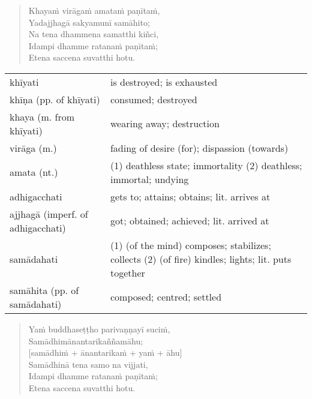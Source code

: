 \documentclass[11pt,oneside]{memoir}
\begin{document}
\begin{quote}
Khayaṁ virāgaṁ amataṁ paṇītaṁ, \\[0pt]
Yadajjhagā sakyamunī samāhito; \\[0pt]
Na tena dhammena samatthi kiñci, \\[0pt]
Idampi dhamme ratanaṁ paṇītaṁ; \\[0pt]
Etena saccena suvatthi hotu.
\end{quote}

\enlargethispage{\baselineskip}

\begin{longtable}{L{\colOne} L{\colTwo}}
khīyati & is destroyed; is exhausted\\[0pt]
khīṇa (pp. of khīyati) & consumed; destroyed\\[0pt]
khaya (m. from khīyati) & wearing away; destruction\\[0pt]
virāga (m.) & fading of desire (for); dispassion (towards)\\[0pt]
amata (nt.) & (1) deathless state; immortality (2) deathless; immortal; undying\\[0pt]
adhigacchati & gets to; attains; obtains; lit. arrives at\\[0pt]
ajjhagā (imperf. of adhigacchati) & got; obtained; achieved; lit. arrived at\\[0pt]
samādahati & (1) (of the mind) composes; stabilizes; collects (2) (of fire) kindles; lights; lit. puts together\\[0pt]
samāhita (pp. of samādahati) & composed; centred; settled\\[0pt]
\end{longtable}

\clearpage

\begin{quote}
Yaṁ buddhaseṭṭho parivaṇṇayī suciṁ, \\[0pt]
Samādhimānantarikaññamāhu; \\[0pt]
[samādhiṁ + ānantarikaṁ + yaṁ + āhu] \\[0pt]
Samādhinā tena samo na vijjati, \\[0pt]
Idampi dhamme ratanaṁ paṇītaṁ; \\[0pt]
Etena saccena suvatthi hotu.
\end{quote}
\end{document}
